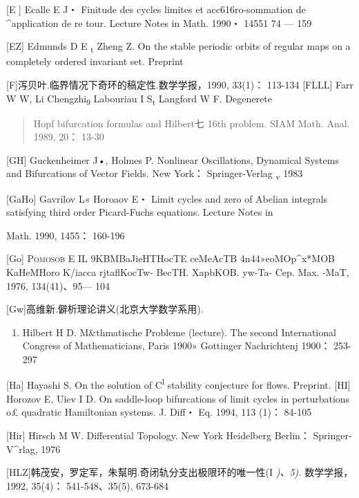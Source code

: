 {[}E {]} Ecalle E J・ Finitude des cycles limites et acc616ro-sommation
de \^{}application de re tour. Lecture Notes in Math. 1990・ 14551 74
--- 159

{[}EZ{]} Edmunds D E \textsubscript{t} Zheng Z. On the stable periodic
orbits of regular maps on a completely ordered invariant set. Preprint

{[}F{]}泻贝叶.临界情况下奇环的稿定性.数学学报，1990, 33(1)： 113-134
{[}FLLL{]} Farr W W, Li Chengzhi\textsubscript{9} Labouriau I
S\textsubscript{t} Langford W F. Degenerete

\begin{quote}
Hopf bifurcation formulas and Hilbert七 16th problem. SIAM Math. Anal.
1989, 20： 13-30
\end{quote}

{[}GH{]} Guckenheimer J•, Holmes P. Nonlinear Oscillations, Dynamical
Systems and Bifurcations of Vector Fields. New York： Springer-Verlag
\textsubscript{v} 1983

{[}GaHo{]} Gavrilov L« Horoaov E・ Limit cycles and zero of Abelian
integrals satisfying third order Picard-Fuchs equations. Lecture Notes
in

Math. 1990, 1455： 160-196

{[}Go{]} \textsc{Pomosob} E IL 9KBMBaJieHTHocTE ceMeAcTB
4n44»eoMOp\^{}x*MOB KaHeMHoro K/iacca rjtaflKocTw- BecTH. XapbKOB.
yw-Ta- Cep. Max. -MaT, 1976, 134(41)、95--- 104

{[}Gw{]}高维新.僻析理论讲义(北京大学数学系用).

\begin{enumerate}
\def\labelenumi{\Alph{enumi}.}
\setcounter{enumi}{7}
\item
  Hilbert H D. M\&thmatische Probleme (lecture). The second
  Internation­al Congress of Mathematicians, Paris 1900» Gottinger
  Nachrichtenj 1900： 253-297
\end{enumerate}

{[}Ha{]} Hayashi S. On the solution of C\textsuperscript{l} stability
conjecture for flows. Preprint. {[}HI{]} Horozov E, Uiev I D. On
saddle-loop bifurcations of limit cycles in per­turbations o£ quadratic
Hamiltonian systems. J. Diff・ Eq. 1994, 113 (1)： 84-105

{[}Hir{]} Hirsch M W. Differential Topology. New York Heidelberg
Berlin： Springer-V\^{}rlag, 1976

{[}HLZ{]}韩茂安，罗定军，朱幫明.奇闭轨分支出极限环的唯一性(I
\emph{)、5).} 数学学报，1992, 35(4)： 541-548、35(5), 673-684


